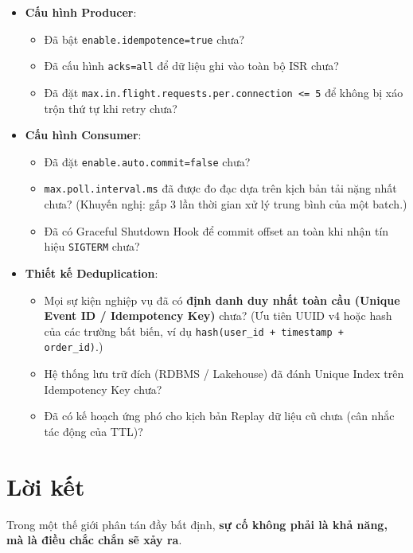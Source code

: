\documentclass[12pt]{article}
\begin{document}
\begin{itemize}[label=$\square$]
    \item \textbf{Cấu hình Producer}:
    \begin{itemize}[label=$\square$]
        \item Đã bật \texttt{enable.idempotence=true} chưa?
        \item Đã cấu hình \texttt{acks=all} để dữ liệu ghi vào toàn bộ ISR chưa?
        \item Đã đặt \texttt{max.in.flight.requests.per.connection <= 5} để không bị xáo trộn thứ tự khi retry chưa?
    \end{itemize}
    \item \textbf{Cấu hình Consumer}:
    \begin{itemize}[label=$\square$]
        \item Đã đặt \texttt{enable.auto.commit=false} chưa?
        \item \texttt{max.poll.interval.ms} đã được đo đạc dựa trên kịch bản tải nặng nhất chưa? (Khuyến nghị: gấp 3 lần thời gian xử lý trung bình của một batch.)
        \item Đã có Graceful Shutdown Hook để commit offset an toàn khi nhận tín hiệu \texttt{SIGTERM} chưa?
    \end{itemize}
    \item \textbf{Thiết kế Deduplication}:
    \begin{itemize}[label=$\square$]
        \item Mọi sự kiện nghiệp vụ đã có \textbf{định danh duy nhất toàn cầu (Unique Event ID / Idempotency Key)} chưa? (Ưu tiên UUID v4 hoặc hash của các trường bất biến, ví dụ \texttt{hash(user\_id + timestamp + order\_id)}.)
        \item Hệ thống lưu trữ đích (RDBMS / Lakehouse) đã đánh Unique Index trên Idempotency Key chưa?
        \item Đã có kế hoạch ứng phó cho kịch bản Replay dữ liệu cũ chưa (cân nhắc tác động của TTL)?
    \end{itemize}
\end{itemize}

\section{Lời kết}

Trong một thế giới phân tán đầy bất định, \textbf{sự cố không phải là khả năng, mà là điều chắc chắn sẽ xảy ra}.
\end{document}
